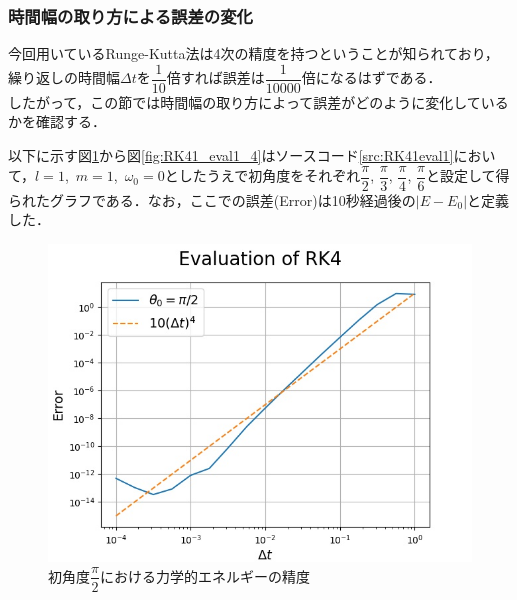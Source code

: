 \documentclass[a4paper,11pt]{jsarticle}
\begin{document}
\subsubsection{時間幅の取り方による誤差の変化}
今回用いているRunge-Kutta法は4次の精度を持つということが知られており，繰り返しの時間幅\(\Delta t\)を\(\dfrac{1}{10}\)倍すれば誤差は\(\dfrac{1}{10000}\)倍になるはずである．\\
したがって，この節では時間幅の取り方によって誤差がどのように変化しているかを確認する．\par
以下に示す図\ref{fig:RK41_eval1_1}から図\ref{fig:RK41_eval1_4}はソースコード\ref{src:RK41eval1}において，\(l=1\),\ \(m=1\),\ \(\omega_0=0\)としたうえで初角度をそれぞれ\(\dfrac{\pi}{2}\), \(\dfrac{\pi}{3}\), \(\dfrac{\pi}{4}\), \(\dfrac{\pi}{6}\)と設定して得られたグラフである．なお，ここでの誤差(Error)は10秒経過後の\(|E-E_0|\)と定義した．
\begin{figure}[H]
  \begin{center}
    \includegraphics[scale=0.8]{figure/RK41/evaluation1/pi2_2021-2-9-222927.jpeg}
    \caption{初角度\(\dfrac{\pi}{2}における力学的エネルギーの精度\)}
    \label{fig:RK41_eval1_1}
  \end{center}
\end{figure}
\end{document}
